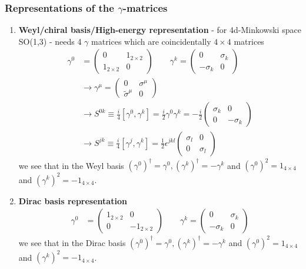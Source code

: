 \documentclass[10pt,a4paper]{report}
\theoremstyle{definition}
\begin{document}
\subsubsection{Representations of the $\gamma$-matrices}
\begin{enumerate}
\item {\bf Weyl/chiral basis/High-energy representation} - for 4d-Minkowski space SO(1,3) - needs 4 $\gamma$ matrices which are coincidentally $4\times4$ matrices
\begin{align}
\gamma^0&=\left(\begin{array}{cc}0 &1_{2\times2}\\1_{2\times2} &0\end{array}\right)
\qquad
\gamma^k=\left(\begin{array}{cc}0 & \sigma_k\\ -\sigma_k &0\end{array}\right)\\
&\rightarrow\gamma^\mu=\left(\begin{array}{cc}0 & \sigma^\mu\\ \tilde{\sigma}^\mu &0\end{array}\right)\\
&\rightarrow S^{0k}\equiv\frac{i}{4}[\gamma^0,\gamma^k]=\frac{i}{2}\gamma^0\gamma^k=-\frac{i}{2}\left(\begin{array}{cc}\sigma_k &0\\0 &-\sigma_k\end{array}\right)\\
&\rightarrow S^{jk}\equiv\frac{i}{4}[\gamma^j,\gamma^k]=\frac{1}{2}\epsilon^{jkl}\left(\begin{array}{cc}\sigma_l &0\\0 &\sigma_l\end{array}\right)
\end{align}
we see that in the Weyl basis $(\gamma^0)^\dagger=\gamma^0, (\gamma^k)^\dagger=-\gamma^k$ and $(\gamma^0)^2=1_{4\times4}$ and $(\gamma^k)^2=-1_{4\times4}$.

\item {\bf Dirac basis representation}
\begin{align}
\gamma^0&=\left(\begin{array}{cc}1_{2\times2}&0\\0&-1_{2\times2}\end{array}\right)\qquad
\gamma^k=\left(\begin{array}{cc}0 & \sigma_k\\ -\sigma_k &0\end{array}\right)
\end{align}
we see that in the Dirac basis $(\gamma^0)^\dagger=\gamma^0, (\gamma^k)^\dagger=-\gamma^k$ and $(\gamma^0)^2=1_{4\times4}$ and $(\gamma^k)^2=-1_{4\times4}$.
\end{enumerate}
\end{document}
